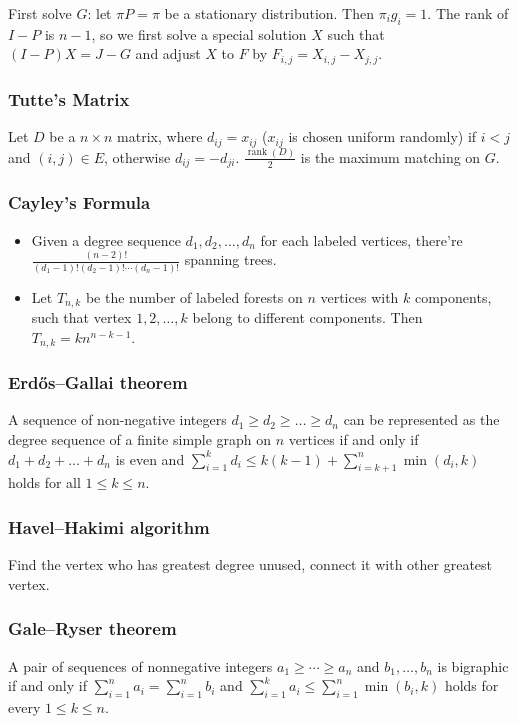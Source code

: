 \noindent
First solve $G$: let $\pi P = \pi$ be a stationary distribution. Then $\pi_i g_i = 1$.
The rank of $I - P$ is $n - 1$, so we first solve a special solution $X$ such that $(I - P)X = J - G$ and adjust $X$ to $F$ by
$F_{i,j} = X_{i,j} - X_{j,j}$.

\subsubsection{Tutte's Matrix}
Let $D$ be a $n \times n$ matrix, where $d_{ij} = x_{ij}$ ($x_{ij}$ is chosen uniform randomly) if $i < j$ and $(i, j) \in E$, otherwise $d_{ij} = -d_{ji}$. $\frac{\operatorname{rank}(D)}{2}$ is the maximum matching on $G$.

\subsubsection{Cayley's Formula}
\begin{itemize}
  \item Given a degree sequence $d_1, d_2, \ldots, d_n$ for each labeled vertices, there're $\frac{(n - 2)!}{(d_1 - 1)!(d_2 - 1)!\cdots(d_n - 1)!}$ spanning trees.
  \item Let $T_{n, k}$ be the number of labeled forests on $n$ vertices with $k$ components, such that vertex $1, 2, \ldots, k$ belong to different components. Then $T_{n, k} = kn^{n - k - 1}$.
\end{itemize}

\subsubsection{Erdős–Gallai theorem}
A sequence of non-negative integers $d_1 \geq d_2 \geq \ldots \geq d_n$ can be represented as the degree sequence of a finite simple graph on $n$ vertices if and only if $d_1 + d_2 + \ldots + d_n$ is even and
$\sum_{i = 1}^{k}d_i \leq k(k - 1) + \sum_{i = k + 1}^{n}\min(d_i, k)$
holds for all $1 \leq k \leq n$.

\subsubsection{Havel–Hakimi algorithm}
Find the vertex who has greatest degree unused, connect it with other greatest vertex.

\subsubsection{Gale–Ryser theorem}
A pair of sequences of nonnegative integers $a_1\ge\cdots\ge a_n$ and $b_1,\ldots,b_n$ is bigraphic if and only if $\sum_{i=1}^n a_i=\sum_{i=1}^n b_i$ and $\sum_{i=1}^k a_i\le \sum_{i=1}^n\min(b_i,k)$ holds for every $1\le k\le n$.

